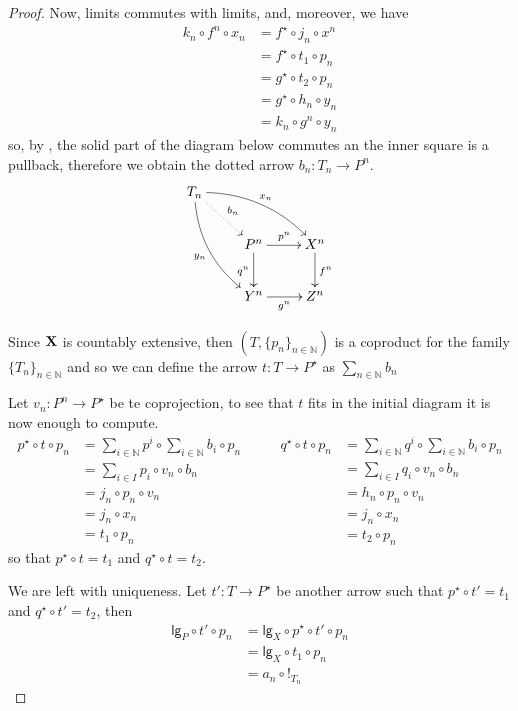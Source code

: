 \documentclass[runningheads,envcountsect]{llncs}
\newcommand{\lgh}{\mathsf{lg}}
\def\X{\textbf {\textup{X}}}
\begin{document}
\begin{proof}
	
	Now, limits commutes with limits, and, moreover, we have
	\begin{align*}	
	k_n\circ f^n\circ x_n & =f^\star \circ j_n\circ x^n\\&=f^\star \circ t_1\circ p_n\\&=g^\star \circ t_2\circ p_n\\&=g^\star \circ h_n\circ y_n\\&=k_n \circ g^n\circ y_n 
	\end{align*}
	so, by , the solid part of the diagram below commutes an the inner square is a pullback, therefore we obtain the dotted arrow $b_n\colon T_n\to P^n $.
	\[\xymatrix{T_n \ar@{.>}[dr]^{b_n}  \ar@/^.4cm/[drr]^{x_n} \ar@/_.4cm/[ddr]_{y_n} \\ & P^n \ar[d]_{q^n} \ar[r]^{p^n}& X^n \ar[d]^{f^n}\\ &  Y^n  \ar[r]_{g^n}& Z^n}\]
	
	Since $\X$ is countably extensive, then $(T, \{p_n\}_{n\in \mathbb{N}})$ is a coproduct for the family $\{T_n\}_{n\in \mathbb{N}}$ and so we can define the arrow $t\colon T\to P^\star$ as $\sum_{n\in \mathbb{N}} b_n$
	
	Let $v_n\colon P^n\to P^\star$ be te coprojection, to see that $t$ fits in the initial diagram it is now enough to compute.
	\[\begin{split}
		p^\star \circ t \circ p_n&= \sum_{i\in \mathbb{N}} p^i \circ \sum_{i\in \mathbb{N}} b_i\circ p_n\\&
		=\sum_{i\in I}p_i\circ v_n\circ b_n\\&= j_n\circ p_n\circ v_n\\&=j_n\circ x_n\\&=t_1\circ p_n
 	\end{split} \qquad \begin{split}
 	q^\star \circ t \circ p_n&= \sum_{i\in \mathbb{N}} q^i \circ \sum_{i\in \mathbb{N}} b_i\circ p_n\\&
 	=\sum_{i\in I}q_i\circ v_n\circ b_n\\&= h_n\circ p_n\circ v_n\\&=j_n\circ x_n\\&=t_2\circ p_n
 	\end{split}\]
 	so that $p^\star \circ t = t_1$ and $q^\star\circ t = t_2$.
	
We are left with uniqueness. Let $t'\colon T\to P^\star$ be another arrow such that $p^\star \circ t' = t_1$ and $q^\star\circ t' = t_2$, then
\begin{align*}
\lgh_P\circ t' \circ p_n&=\lgh_X\circ p^\star \circ t'\circ p_n\\&=\lgh_X\circ t_1\circ p_n\\&=a_n\circ !_{T_n}
\end{align*}


\end{proof}
\end{document}
